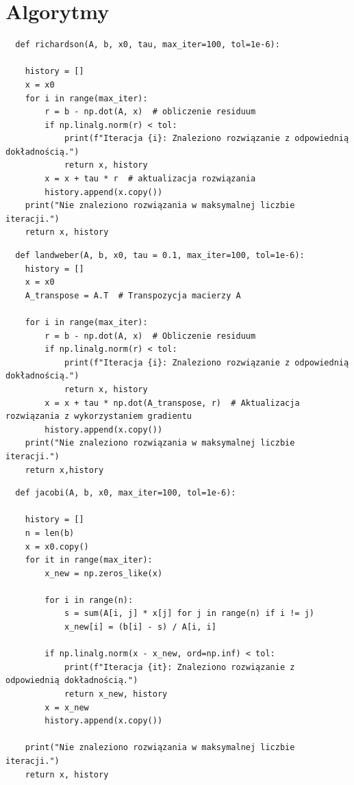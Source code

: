 \documentclass{article}
\begin{document}
\section{Algorytmy}
\begin{lstlisting}
  def richardson(A, b, x0, tau, max_iter=100, tol=1e-6):
    
    history = []
    x = x0
    for i in range(max_iter):
        r = b - np.dot(A, x)  # obliczenie residuum
        if np.linalg.norm(r) < tol:
            print(f"Iteracja {i}: Znaleziono rozwiązanie z odpowiednią dokładnością.")
            return x, history
        x = x + tau * r  # aktualizacja rozwiązania
        history.append(x.copy())
    print("Nie znaleziono rozwiązania w maksymalnej liczbie iteracji.")
    return x, history
\end{lstlisting}
\begin{lstlisting}
  def landweber(A, b, x0, tau = 0.1, max_iter=100, tol=1e-6):
    history = []
    x = x0
    A_transpose = A.T  # Transpozycja macierzy A

    for i in range(max_iter):
        r = b - np.dot(A, x)  # Obliczenie residuum
        if np.linalg.norm(r) < tol:
            print(f"Iteracja {i}: Znaleziono rozwiązanie z odpowiednią dokładnością.")
            return x, history
        x = x + tau * np.dot(A_transpose, r)  # Aktualizacja rozwiązania z wykorzystaniem gradientu
        history.append(x.copy())
    print("Nie znaleziono rozwiązania w maksymalnej liczbie iteracji.")
    return x,history
\end{lstlisting}
\begin{lstlisting}
  def jacobi(A, b, x0, max_iter=100, tol=1e-6):
    
    history = []
    n = len(b)
    x = x0.copy()
    for it in range(max_iter):
        x_new = np.zeros_like(x)

        for i in range(n):
            s = sum(A[i, j] * x[j] for j in range(n) if i != j)
            x_new[i] = (b[i] - s) / A[i, i]

        if np.linalg.norm(x - x_new, ord=np.inf) < tol:
            print(f"Iteracja {it}: Znaleziono rozwiązanie z odpowiednią dokładnością.")
            return x_new, history
        x = x_new
        history.append(x.copy())

    print("Nie znaleziono rozwiązania w maksymalnej liczbie iteracji.")
    return x, history
\end{lstlisting}
\end{document}
